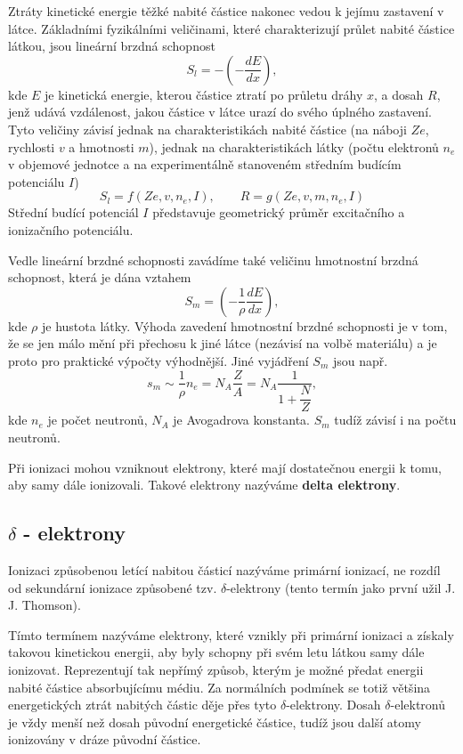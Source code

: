 \documentclass[../../main.tex]{subfiles}
\begin{document}
Ztráty kinetické energie těžké nabité částice nakonec vedou k jejímu zastavení v látce. Základními fyzikálními veličinami, které charakterizují průlet nabité částice látkou, jsou lineární brzdná schopnost
\begin{equation}
  S_l = - \left(- \dfrac{dE}{dx} \right) ,
\end{equation}
kde $E$ je kinetická energie, kterou částice ztratí po průletu dráhy $x$, a dosah $R$, jenž udává vzdálenost, jakou částice v látce urazí do svého úplného zastavení. Tyto veličiny závisí jednak na charakteristikách nabité částice (na náboji $Ze$, rychlosti $v$ a hmotnosti $m$), jednak na charakteristikách látky (počtu elektronů $n_e$ v objemové jednotce a na experimentálně stanoveném středním budícím potenciálu $I$)
\begin{equation}
S_l = f(Ze, v, n_e, I), ~~~~~~~~~ R= g (Ze, v, m, n_e, I)
\end{equation}
Střední budící potenciál $I$ představuje geometrický průměr excitačního a ionizačního potenciálu.

Vedle lineární brzdné schopnosti zavádíme také veličinu hmotnostní brzdná schopnost, která je dána vztahem
\begin{equation}
S_m = \left( - \dfrac{1}{\rho} \dfrac{dE}{dx} \right) ,
\end{equation}
kde $\rho$ je hustota látky. Výhoda zavedení hmotnostní brzdné schopnosti je v tom, že se jen málo mění při přechosu k jiné látce (nezávisí na volbě materiálu) a je proto pro praktické výpočty výhodnější. Jiné vyjádření $S_m$ jsou např.
\begin{equation}
s_m \sim \dfrac{1}{\rho} n_e = N_A \dfrac{Z}{A} = N_A \dfrac{1}{1 + \dfrac{N}{Z}},
\end{equation}
kde $n_e$ je počet neutronů, $N_A$ je Avogadrova konstanta. $S_m$ tudíž závisí i na počtu neutronů.

Při ionizaci mohou vzniknout elektrony, které mají dostatečnou energii k tomu, aby samy dále ionizovali. Takové elektrony nazýváme \textbf{delta elektrony}.

\subsection{$\delta$ - elektrony}

Ionizaci způsobenou letící nabitou částicí nazýváme primární ionizací, ne rozdíl od sekundární ionizace způsobené tzv. $\delta$-elektrony (tento termín jako první užil J. J. Thomson).

Tímto termínem nazýváme elektrony, které vznikly při primární ionizaci a získaly takovou kinetickou energii, aby byly schopny při svém letu látkou samy dále ionizovat. Reprezentují tak nepřímý způsob, kterým je možné předat energii nabité částice absorbujícímu médiu. Za normálních podmínek  se totiž většina energetických ztrát nabitých částic děje přes tyto $\delta$-elektrony. Dosah $\delta$-elektronů je vždy menší než dosah původní energetické částice, tudíž jsou další atomy ionizovány v dráze původní částice. 
\end{document}
